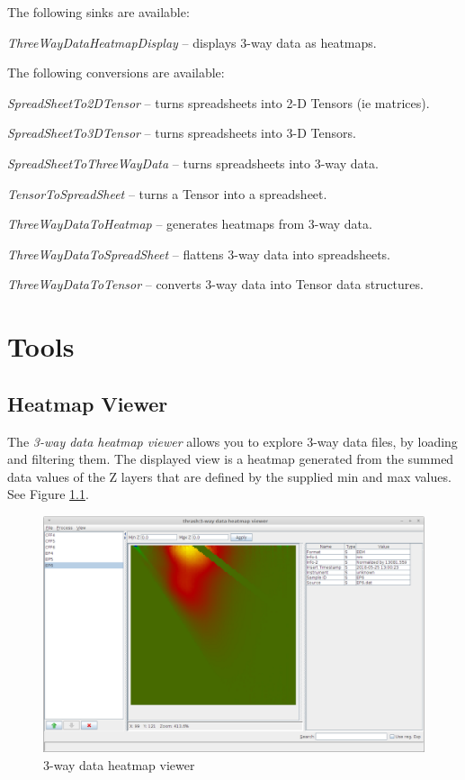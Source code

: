 \documentclass[a4paper]{book}
\begin{document}
\noindent The following sinks are available:
\begin{tight_itemize}
  \item \textit{ThreeWayDataHeatmapDisplay} -- displays 3-way data as heatmaps.
\end{tight_itemize}

\noindent The following conversions are available:
\begin{tight_itemize}
  \item \textit{SpreadSheetTo2DTensor} -- turns spreadsheets into 2-D Tensors (ie matrices).
  \item \textit{SpreadSheetTo3DTensor} -- turns spreadsheets into 3-D Tensors.
  \item \textit{SpreadSheetToThreeWayData} -- turns spreadsheets into 3-way data.
  \item \textit{TensorToSpreadSheet} -- turns a Tensor into a spreadsheet.
  \item \textit{ThreeWayDataToHeatmap} -- generates heatmaps from 3-way data.
  \item \textit{ThreeWayDataToSpreadSheet} -- flattens 3-way data into spreadsheets.
  \item \textit{ThreeWayDataToTensor} -- converts 3-way data into Tensor data structures.
\end{tight_itemize}

\chapter{Tools}
\section{Heatmap Viewer}
The \textit{3-way data heatmap viewer} allows you to explore 3-way data files,
by loading and filtering them. The displayed view is a heatmap generated from
the summed data values of the Z layers that are defined by the supplied min
and max values. See Figure \ref{heatmapviewer}.

\begin{figure}[htb]
  \centering
  \includegraphics[width=12.0cm]{images/heatmapviewer.png}
  \caption{3-way data heatmap viewer}
  \label{heatmapviewer}
\end{figure}


\end{document}
